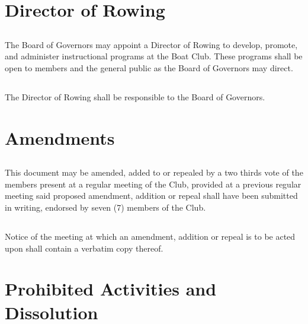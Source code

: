 \documentclass[11pt,american,letterpaper,]{constitution}
\begin{document}
\section{Director of Rowing}

\subsection[General]{} 

The Board of Governors may appoint a Director of Rowing to develop, promote, and administer instructional programs at the Boat Club. These programs shall be open to members and the general public as the Board of Governors may direct.

\subsection[Responsibility]{} 

The Director of Rowing shall be responsible to the Board of Governors.

\section{Amendments}

\subsection[Requirements]{} 

This document may be amended, added to or repealed by a two thirds vote of the members present at a regular meeting of the Club, provided at a previous regular meeting said proposed amendment, addition or repeal shall have been submitted in writing, endorsed by seven (7) members of the Club.

\subsection[Notice]{} 

Notice of the meeting at which an amendment, addition or repeal is to be acted upon shall contain a verbatim copy thereof.

\section{Prohibited Activities and Dissolution}

\subsection[Contributions]{} 
\end{document}
